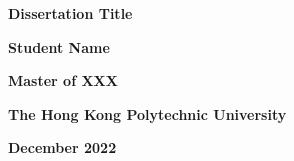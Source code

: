 \thispagestyle{empty}
\begin{center}
\Large

\textbf{Dissertation Title}

\vspace{2.0in}

\textbf{Student Name}

\vspace{1.5in}

\textbf{Master of XXX}

\vspace{0.5in}

\textbf{The Hong Kong Polytechnic University}


\textbf{December 2022}

\end{center}